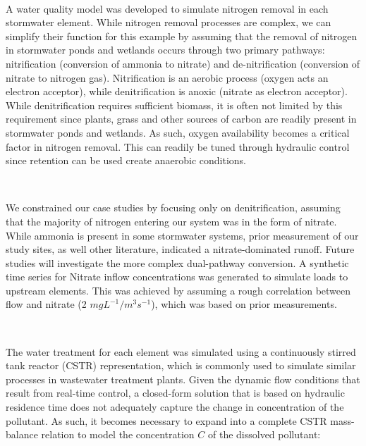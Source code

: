 \

A water quality model was developed to simulate nitrogen removal in each
stormwater element. While nitrogen removal processes are complex, we can
simplify their function for this example by assuming that the removal of nitrogen in stormwater ponds and wetlands occurs through two primary pathways: nitrification (conversion of ammonia to nitrate) and de-nitrification (conversion of nitrate to nitrogen gas)\cite{Kadlec2008TreatmentWetlands, Reddy1989Nitrification-DenitrificationWetlands}.  Nitrification is an aerobic process (oxygen acts an electron acceptor), while denitrification is anoxic (nitrate as electron acceptor). While denitrification requires sufficient biomass, it is often not limited by this requirement since plants, grass and other sources of carbon are readily present in stormwater ponds and wetlands\cite{White2009BiogeochemicalWetlands}. 
As such, oxygen availability becomes a critical factor in nitrogen removal. This can readily be tuned through hydraulic control since retention can be used create anaerobic conditions. 

\

We constrained our case studies by focusing only on denitrification, assuming that the majority of nitrogen entering our system was in the form of nitrate. While ammonia is present in some stormwater systems, prior measurement of our study sites, as well other literature\cite{Kadlec2008TreatmentWetlands}, indicated a nitrate-dominated runoff. 
Future studies will investigate the more complex dual-pathway conversion. 
A synthetic time series for Nitrate inflow concentrations was generated to simulate loads to upstream elements. 
This was achieved by assuming a rough correlation between flow and nitrate (2 $mgL^{-1}/m^3s^{-1}$), which was based on prior measurements\cite{Kerkez2016SmarterSystems}.

\

The water treatment for each element was simulated using a continuously stirred tank reactor (CSTR) representation, which is commonly used to simulate similar processes in wastewater treatment plants\cite{Henze2000ActivatedASM3}.
Given the dynamic flow conditions that result from real-time control, a closed-form solution that is based on hydraulic residence time does not adequately capture the change in concentration of the pollutant.
As such, it becomes necessary to expand into a complete CSTR mass-balance relation\cite{Alvord1996AtrazineWetlands,Kadlec2001PhosphorusWetlands,Munson2002ModelArea} to model the concentration $C$ of the dissolved pollutant:

